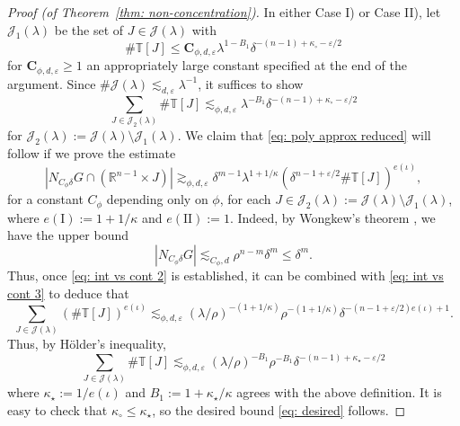 \documentclass[reqno]{amsart}
\numberwithin{equation}{section}
\newcommand{\R}{\mathbb{R}}
\newcommand{\T}{\mathbb{T}}
\newcommand{\cJ}{\mathcal{J}}
\newcommand{\bC}{\mathbf{C}}
\theoremstyle{plain}
\theoremstyle{definition}
\newcommand{\tI}{\mathrm{I}}
\newcommand{\tII}{\mathrm{II}}
\begin{document}
\begin{proof}[Proof (of Theorem~\ref{thm: non-concentration})]
In either Case I) or Case II), let $\cJ_1(\lambda)$ be the set of $J\in \cJ(\lambda)$ with
\begin{equation*}
   \#\mathbb{T}[J] \leq \bC_{\phi,d,\varepsilon} \lambda^{1-B_1}\delta^{-(n-1)+\kappa_\circ -\varepsilon/2}
\end{equation*}
for $\bC_{\phi,d,\varepsilon} \geq 1$ an appropriately large constant specified at the end of the argument. Since $\# \cJ(\lambda)\lesssim_{d,\varepsilon}\lambda^{-1}$, it suffices to show
\begin{equation}\label{eq: poly approx reduced}
    \sum_{J\in\cJ_2(\lambda)} \#\mathbb{T}[J]\lesssim_{\phi,d,\varepsilon} \lambda^{-B_1}\delta^{-(n-1)+\kappa_{\circ} -\varepsilon/2}
\end{equation}
for $\cJ_2(\lambda):=\cJ(\lambda)\setminus\cJ_1(\lambda)$. We claim that \eqref{eq: poly approx reduced} will follow if we prove the estimate
    \begin{equation}\label{eq: int vs cont 2}
    |N_{C_\phi\delta} G \cap (\R^{n-1} \times J)|\gtrsim_{\phi, d, \varepsilon} \delta^{m-1}\lambda^{1+1/\kappa} (\delta^{n-1 + \varepsilon/2}\#\T[J])^{e(\iota)},
\end{equation}
for a constant $C_\phi$ depending only on $\phi$, for each $J\in \cJ_2(\lambda):=\cJ(\lambda)\setminus\cJ_1(\lambda)$, where $e(\tI) := 1+1/\kappa$ and $e(\tII) := 1$. Indeed, by Wongkew's theorem \cite{Wongkew1993}, we have the upper bound
\begin{equation}\label{eq: int vs cont 3}
    |N_{C_\phi\delta} G|\lesssim_{C_\phi,d} \rho^{n-m} \delta^m \leq \delta^m.
\end{equation}
Thus, once \eqref{eq: int vs cont 2} is established, it can be combined with \eqref{eq: int vs cont 3} to deduce that
\begin{equation*}
   \sum_{J \in \cJ(\lambda)} (\#\T[J])^{e(\iota)} \lesssim_{\phi, d,\varepsilon} (\lambda/\rho)^{-(1 + 1/\kappa)} \rho^{-(1 + 1/\kappa)} \delta^{-(n-1 + \varepsilon/2)e(\iota) + 1}.
\end{equation*}
Thus, by H\"older's inequality, 
\begin{equation*}
    \sum_{J \in \cJ(\lambda)} \#\T[J] \lesssim_{\phi, d,\varepsilon} (\lambda/\rho)^{-B_1} \rho^{-B_1} \delta^{-(n-1)+\kappa_{\star} - \varepsilon/2}
\end{equation*}
where $\kappa_{\star} := 1/e(\iota)$ and $B_1 := 1 + \kappa_{\star}/\kappa$ agrees with the above definition. It is easy to check that $\kappa_{\circ} \leq \kappa_{\star}$, so the desired bound \eqref{eq: desired} follows. \medskip




\end{proof}
\end{document}
